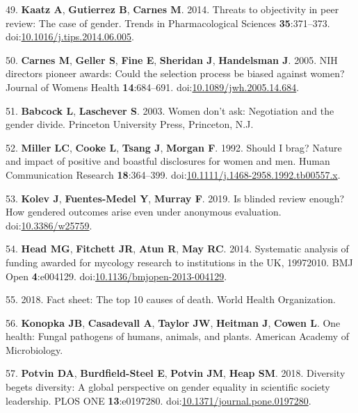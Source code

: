 \documentclass[11pt,]{article}
\begin{document}
\hypertarget{ref-Kaatz2014}{}
49. \textbf{Kaatz A}, \textbf{Gutierrez B}, \textbf{Carnes M}. 2014.
Threats to objectivity in peer review: The case of gender. Trends in
Pharmacological Sciences \textbf{35}:371--373.
doi:\href{https://doi.org/10.1016/j.tips.2014.06.005}{10.1016/j.tips.2014.06.005}.

\hypertarget{ref-Carnes2005}{}
50. \textbf{Carnes M}, \textbf{Geller S}, \textbf{Fine E},
\textbf{Sheridan J}, \textbf{Handelsman J}. 2005. NIH directors pioneer
awards: Could the selection process be biased against women? Journal of
Womens Health \textbf{14}:684--691.
doi:\href{https://doi.org/10.1089/jwh.2005.14.684}{10.1089/jwh.2005.14.684}.

\hypertarget{ref-babcock_women_2003}{}
51. \textbf{Babcock L}, \textbf{Laschever S}. 2003. Women don't ask:
Negotiation and the gender divide. Princeton University Press,
Princeton, N.J.

\hypertarget{ref-MILLER1992}{}
52. \textbf{Miller LC}, \textbf{Cooke L}, \textbf{Tsang J},
\textbf{Morgan F}. 1992. Should I brag? Nature and impact of positive
and boastful disclosures for women and men. Human Communication Research
\textbf{18}:364--399.
doi:\href{https://doi.org/10.1111/j.1468-2958.1992.tb00557.x}{10.1111/j.1468-2958.1992.tb00557.x}.

\hypertarget{ref-Kolev2019}{}
53. \textbf{Kolev J}, \textbf{Fuentes-Medel Y}, \textbf{Murray F}. 2019.
Is blinded review enough? How gendered outcomes arise even under
anonymous evaluation.
doi:\href{https://doi.org/10.3386/w25759}{10.3386/w25759}.

\hypertarget{ref-Head2014}{}
54. \textbf{Head MG}, \textbf{Fitchett JR}, \textbf{Atun R}, \textbf{May
RC}. 2014. Systematic analysis of funding awarded for mycology research
to institutions in the UK, 19972010. BMJ Open \textbf{4}:e004129.
doi:\href{https://doi.org/10.1136/bmjopen-2013-004129}{10.1136/bmjopen-2013-004129}.

\hypertarget{ref-WHO_2018}{}
55. 2018. Fact sheet: The top 10 causes of death. World Health
Organization.

\hypertarget{ref-ASM_2019}{}
56. \textbf{Konopka JB}, \textbf{Casadevall A}, \textbf{Taylor JW},
\textbf{Heitman J}, \textbf{Cowen L}. One health: Fungal pathogens of
humans, animals, and plants. American Academy of Microbiology.

\hypertarget{ref-potvin_diversity_2018}{}
57. \textbf{Potvin DA}, \textbf{Burdfield-Steel E}, \textbf{Potvin JM},
\textbf{Heap SM}. 2018. Diversity begets diversity: A global perspective
on gender equality in scientific society leadership. PLOS ONE
\textbf{13}:e0197280.
doi:\href{https://doi.org/10.1371/journal.pone.0197280}{10.1371/journal.pone.0197280}.
\end{document}
